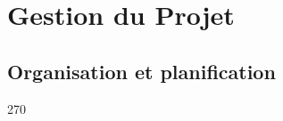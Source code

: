 \documentclass{report}
\begin{document}
\chapter{Gestion du Projet}
\section{Organisation et planification}
\newpage
\begin{rotate}{270}

\end{rotate}
\end{document}
